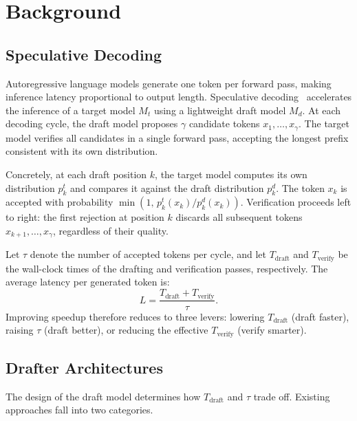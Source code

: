 \section{Background}
\label{sec:background}

\subsection{Speculative Decoding}
\label{sec:spec_decoding}

Autoregressive language models generate one token per forward pass, making inference latency proportional to output length.
Speculative decoding~\citep{ge2022lossless,pmlr-v202-leviathan23a,chen2023accelerating} accelerates the inference of a target model $M_t$ using a lightweight draft model $M_d$.
At each decoding cycle, the draft model proposes $\gamma$ candidate tokens $x_1, \ldots, x_{\gamma}$. The target model verifies all candidates in a single forward pass, accepting the longest prefix consistent with its own distribution.


Concretely, at each draft position $k$, the target model computes its own distribution $p_k^t$ and compares it against the draft distribution $p_k^d$.
The token $x_k$ is accepted with probability $\min(1,\, p_k^t(x_k) / p_k^d(x_k))$.
Verification proceeds left to right: the first rejection at position $k$ discards all subsequent tokens $x_{k+1}, \ldots, x_\gamma$, regardless of their quality.

Let $\tau$ denote the number of accepted tokens per cycle, and let $T_{\text{draft}}$ and $T_{\text{verify}}$ be the wall-clock times of the drafting and verification passes, respectively.
The average latency per generated token is:
\begin{equation}
L = \frac{T_{\text{draft}} + T_{\text{verify}}}{\tau}.
\label{eq:latency}
\end{equation}
Improving speedup therefore reduces to three levers: lowering $T_{\text{draft}}$ (draft faster), raising $\tau$ (draft better), or reducing the effective $T_{\text{verify}}$ (verify smarter).

\subsection{Drafter Architectures}
\label{sec:drafter_arch}

The design of the draft model determines how $T_{\text{draft}}$ and $\tau$ trade off.
Existing approaches fall into two categories.

